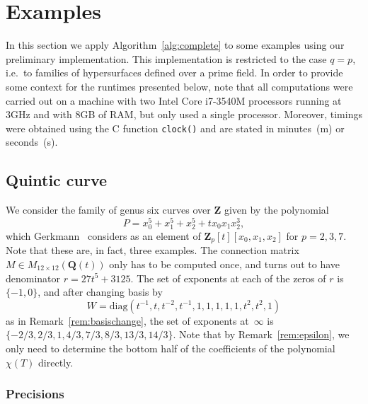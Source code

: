 \documentclass[a4paper,11pt]{article}
\numberwithin{equation}{section}
\newcommand{\ZZ}{\mathbf{Z}} %
\newcommand{\QQ}{\mathbf{Q}} %
\theoremstyle{definition}
\begin{document}

\section{Examples}
\label{sec:Examples}

In this section we apply Algorithm~\ref{alg:complete} to some examples 
using our preliminary implementation\footnotemark.  This implementation 
is restricted to the case $q = p$, i.e.\ to families of hypersurfaces 
defined over a prime field.  In order to provide some context for the 
runtimes presented below, note that all computations were carried out 
on a machine with two Intel Core i7-3540M processors running at 3GHz and 
with 8GB of RAM, but only used a single processor.  Moreover, timings were obtained using the C function 
{\tt{clock()}} and are stated in minutes~(m) or seconds~(s). 



\subsection{Quintic curve}

We consider the family of genus six curves over $\ZZ$ given by the polynomial 
\begin{equation*}
P=x_0^5 + x_1^5 + x_2^5 + t x_0 x_1 x_2^3,
\end{equation*}
which Gerkmann~\citep[\S 7.4]{Gerkmann2007} considers as an element of 
$\ZZ_p[t][x_0,x_1,x_2]$ for $p=2,3,7$.  Note that these are, in fact, 
three examples.  The connection matrix $M \in M_{12 \times 12}(\QQ(t))$ 
only has to be computed once, and turns out to have denominator $r=27t^5+3125$.
The set of exponents at each of the zeros of $r$ is $\{-1,0\}$, and 
after changing basis by
\[ 
W=\mbox{diag}(t^{-1},t,t^{-2},t^{-1},1,1,1,1,1,t^2,t^2,1)
\] 
as in Remark~\ref{rem:basischange}, the set of exponents at~$\infty$ is 
$\{-2/3,2/3,1,4/3,7/3,8/3,13/3,14/3\}$.  Note that by
Remark~\ref{rem:epsilon}, we only need to determine the bottom 
half of the coefficients of the polynomial $\chi(T)$ directly.

\subsubsection{Precisions}
\end{document}
